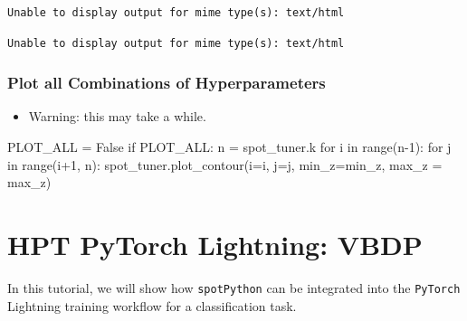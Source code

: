\documentclass[
  letterpaper,
  DIV=11,
  numbers=noendperiod]{scrreprt}
\newenvironment{Shaded}{\begin{snugshade}}{\end{snugshade}}
\newcommand{\BuiltInTok}[1]{\textcolor[rgb]{0.00,0.23,0.31}{#1}}
\newcommand{\ControlFlowTok}[1]{\textcolor[rgb]{0.00,0.23,0.31}{#1}}
\newcommand{\DecValTok}[1]{\textcolor[rgb]{0.68,0.00,0.00}{#1}}
\newcommand{\KeywordTok}[1]{\textcolor[rgb]{0.00,0.23,0.31}{#1}}
\newcommand{\NormalTok}[1]{\textcolor[rgb]{0.00,0.23,0.31}{#1}}
\newcommand{\OperatorTok}[1]{\textcolor[rgb]{0.37,0.37,0.37}{#1}}
\newcommand{\VariableTok}[1]{\textcolor[rgb]{0.07,0.07,0.07}{#1}}
\providecommand{\tightlist}{%
  \setlength{\itemsep}{0pt}\setlength{\parskip}{0pt}}\usepackage{longtable,booktabs,array}
\begin{document}
\begin{verbatim}
Unable to display output for mime type(s): text/html
\end{verbatim}

\begin{verbatim}
Unable to display output for mime type(s): text/html
\end{verbatim}

\hypertarget{plot-all-combinations-of-hyperparameters-5}{%
\subsection{Plot all Combinations of
Hyperparameters}\label{plot-all-combinations-of-hyperparameters-5}}

\begin{itemize}
\tightlist
\item
  Warning: this may take a while.
\end{itemize}

\begin{Shaded}
\begin{Highlighting}[]
\NormalTok{PLOT\_ALL }\OperatorTok{=} \VariableTok{False}
\ControlFlowTok{if}\NormalTok{ PLOT\_ALL:}
\NormalTok{    n }\OperatorTok{=}\NormalTok{ spot\_tuner.k}
    \ControlFlowTok{for}\NormalTok{ i }\KeywordTok{in} \BuiltInTok{range}\NormalTok{(n}\OperatorTok{{-}}\DecValTok{1}\NormalTok{):}
        \ControlFlowTok{for}\NormalTok{ j }\KeywordTok{in} \BuiltInTok{range}\NormalTok{(i}\OperatorTok{+}\DecValTok{1}\NormalTok{, n):}
\NormalTok{            spot\_tuner.plot\_contour(i}\OperatorTok{=}\NormalTok{i, j}\OperatorTok{=}\NormalTok{j, min\_z}\OperatorTok{=}\NormalTok{min\_z, max\_z }\OperatorTok{=}\NormalTok{ max\_z)}
\end{Highlighting}
\end{Shaded}

\hypertarget{sec-hyperparameter-tuning-lightning-31}{%
\chapter{HPT PyTorch Lightning:
VBDP}\label{sec-hyperparameter-tuning-lightning-31}}

In this tutorial, we will show how \texttt{spotPython} can be integrated
into the \texttt{PyTorch} Lightning training workflow for a
classification task.
\end{document}
